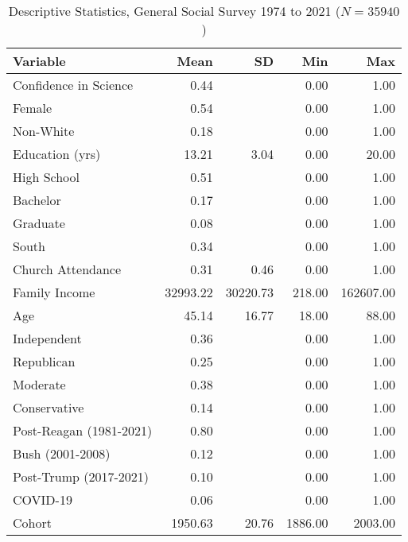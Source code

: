 \begin{table}[ht]
\centering
\caption{Descriptive Statistics, General Social Survey 1974 to 2021 ($N=35940$)} 
\begin{tabular}{lrrrr}
  \toprule
Variable & Mean & SD & Min & Max \\ 
  \midrule
Confidence in Science & 0.44 &  & 0.00 & 1.00 \\ 
  Female & 0.54 &  & 0.00 & 1.00 \\ 
  Non-White & 0.18 &  & 0.00 & 1.00 \\ 
  Education (yrs) & 13.21 & 3.04 & 0.00 & 20.00 \\ 
  High School & 0.51 &  & 0.00 & 1.00 \\ 
  Bachelor & 0.17 &  & 0.00 & 1.00 \\ 
  Graduate & 0.08 &  & 0.00 & 1.00 \\ 
  South & 0.34 &  & 0.00 & 1.00 \\ 
  Church Attendance & 0.31 & 0.46 & 0.00 & 1.00 \\ 
  Family Income & 32993.22 & 30220.73 & 218.00 & 162607.00 \\ 
  Age & 45.14 & 16.77 & 18.00 & 88.00 \\ 
  Independent & 0.36 &  & 0.00 & 1.00 \\ 
  Republican & 0.25 &  & 0.00 & 1.00 \\ 
  Moderate & 0.38 &  & 0.00 & 1.00 \\ 
  Conservative & 0.14 &  & 0.00 & 1.00 \\ 
  Post-Reagan (1981-2021) & 0.80 &  & 0.00 & 1.00 \\ 
  Bush (2001-2008) & 0.12 &  & 0.00 & 1.00 \\ 
  Post-Trump (2017-2021) & 0.10 &  & 0.00 & 1.00 \\ 
  COVID-19 & 0.06 &  & 0.00 & 1.00 \\ 
  Cohort & 1950.63 & 20.76 & 1886.00 & 2003.00 \\ 
   \bottomrule
\end{tabular}
\end{table}
